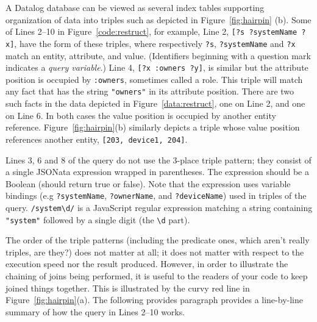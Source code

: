\documentclass[9pt,letterpaper]{article}
\newcommand{\stt}[1]{\texttt{#1}}
\begin{document}
A Datalog database can be viewed as several index tables supporting organization of data into triples such as depicted in Figure~\ref{fig:hairpin} (b).
Some of Lines 2--10 in Figure~\ref{code:restruct}, for example, Line 2, \stt{[?s ?systemName ?x]}, have the form of these triples, where respectively \stt{?s}, \stt{?systemName} and \stt{?x} match an entity, attribute, and value.
(Identifiers beginning with a question mark indicates a \textit{query variable}.)
Line 4, \stt{[?x :owners ?y]}, is similar but the attribute position is occupied by \stt{:owners}, sometimes called a role.
This triple will match any fact that has the string \stt{"owners"} in its attribute position.
There are two such facts in the data depicted in Figure~\ref{data:restruct}, one on Line 2, and one on Line 6.
In both cases the value position is occupied by another entity reference.
Figure~\ref{fig:hairpin}(b) similarly depicts a triple whose value position references another entity, \stt{[203, device1, 204]}.

Lines 3, 6 and 8 of the query do not use the 3-place triple pattern; they consist of a single JSONata expression wrapped in parentheses.
The expression should be a Boolean (should return true or false).
 Note that the expression uses variable bindings (e.g \stt{?systemName}, \stt{?ownerName}, and \stt{?deviceName}) used in triples of the query.
 \stt{/system\textbackslash d/} is a JavaScript regular expression matching a string containing \stt{"system"} followed by a single digit (the \stt{\textbackslash d} part).

The order of the triple patterns (including the predicate ones, which aren't really triples, are they?) does not matter at all; it does not matter with respect to the execution speed nor the result produced.
However, in order to illustrate the chaining of joins being performed, it is useful to the readers of your code to keep joined things together.
This is illustrated by the curvy red line in Figure~\ref{fig:hairpin}(a).
The following provides paragraph provides a line-by-line summary of how the query in Lines 2--10 works.
\end{document}
